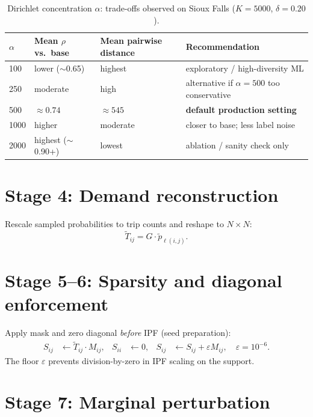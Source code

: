 \documentclass[11pt,a4paper]{report}
\begin{document}
\begin{table}[ht]
\centering
\caption{Dirichlet concentration $\alpha$: trade-offs observed on Sioux Falls ($K=5000$, $\delta=0.20$).}
\label{tab:alpha}
\begin{tabular}{@{}llll@{}}
\toprule
$\alpha$ & Mean $\rho$ vs.\ base & Mean pairwise distance & Recommendation \\
\midrule
100  & lower ($\sim$0.65) & highest & exploratory / high-diversity ML \\
250  & moderate           & high    & alternative if $\alpha=500$ too conservative \\
500  & $\approx 0.74$     & $\approx 545$ & \textbf{default production setting} \\
1000 & higher             & moderate & closer to base; less label noise \\
2000 & highest ($\sim$0.90+) & lowest & ablation / sanity check only \\
\bottomrule
\end{tabular}
\end{table}

\section{Stage 4: Demand reconstruction}

Rescale sampled probabilities to trip counts and reshape to $N\times N$:
\begin{equation}
    \tilde{T}_{ij} = G \cdot \tilde{p}_{\ell(i,j)}.
\end{equation}

\section{Stage 5--6: Sparsity and diagonal enforcement}

Apply mask and zero diagonal \emph{before} IPF (seed preparation):
\begin{align}
    S_{ij} &\leftarrow \tilde{T}_{ij} \cdot M_{ij}, &
    S_{ii} &\leftarrow 0, &
    S_{ij} &\leftarrow S_{ij} + \varepsilon M_{ij}, \quad \varepsilon=10^{-6}.
\end{align}
The floor $\varepsilon$ prevents division-by-zero in IPF scaling on the support.

\section{Stage 7: Marginal perturbation}
\end{document}
